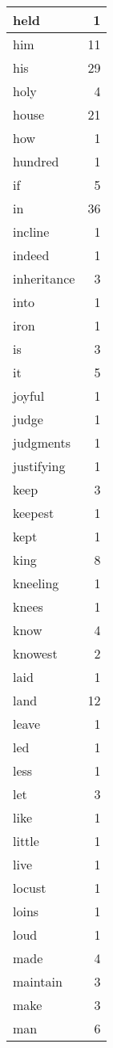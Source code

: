 \begin{center}
\begin{longtable}{l|r}
held & 1 \\ \hline
him & 11 \\ \hline
his & 29 \\ \hline
holy & 4 \\ \hline
house & 21 \\ \hline
how & 1 \\ \hline
hundred & 1 \\ \hline
if & 5 \\ \hline
in & 36 \\ \hline
incline & 1 \\ \hline
indeed & 1 \\ \hline
inheritance & 3 \\ \hline
into & 1 \\ \hline
iron & 1 \\ \hline
is & 3 \\ \hline
it & 5 \\ \hline
joyful & 1 \\ \hline
judge & 1 \\ \hline
judgments & 1 \\ \hline
justifying & 1 \\ \hline
keep & 3 \\ \hline
keepest & 1 \\ \hline
kept & 1 \\ \hline
king & 8 \\ \hline
kneeling & 1 \\ \hline
knees & 1 \\ \hline
know & 4 \\ \hline
knowest & 2 \\ \hline
laid & 1 \\ \hline
land & 12 \\ \hline
leave & 1 \\ \hline
led & 1 \\ \hline
less & 1 \\ \hline
let & 3 \\ \hline
like & 1 \\ \hline
little & 1 \\ \hline
live & 1 \\ \hline
locust & 1 \\ \hline
loins & 1 \\ \hline
loud & 1 \\ \hline
made & 4 \\ \hline
maintain & 3 \\ \hline
make & 3 \\ \hline
man & 6 \\ \hline

\end{longtable}
\end{center}
